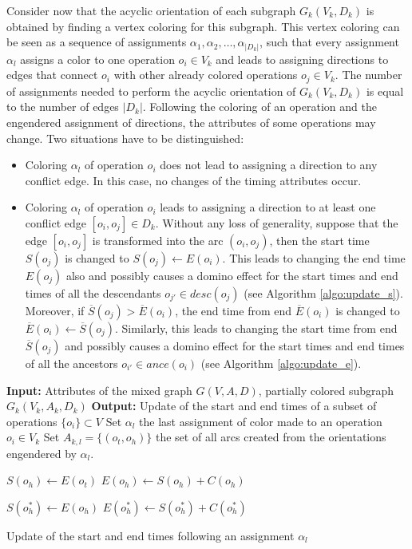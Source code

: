 Consider now that the acyclic orientation of each subgraph $G_k(V_k,D_k)$ is obtained by finding a vertex coloring for this subgraph. This vertex coloring can be seen as a sequence of assignments $\alpha_1, \alpha_2, \ldots, \alpha_{|D_k|}$, such that every assignment $\alpha_l$ assigns a color to one operation $o_i \in V_k$ and leads to assigning directions to edges that connect $o_i$ with other already colored operations $o_j \in V_k$. The number of assignments needed to perform the acyclic orientation of $G_k(V_k,D_k)$ is equal to the number of edges $|D_k|$. Following the coloring of an operation and the engendered assignment of directions, the attributes of some operations may change. Two situations have to be distinguished:

\begin{itemize}
\item Coloring $\alpha_l$ of operation $o_i$ does not lead to assigning a direction to any conflict edge. In this case, no changes of the timing attributes occur.
\item Coloring $\alpha_l$ of operation $o_i$ leads to assigning a direction to at least one conflict edge $[o_i,o_j] \in D_k$. Without any loss of generality, suppose that the edge $[o_i,o_j]$ is transformed into the arc $(o_i,o_j)$, then the start time $S(o_j)$ is changed to $S(o_j) \leftarrow E(o_i)$. This leads to changing the end time $E(o_j)$ also and possibly causes a domino effect for the start times and end times of all the descendants $o_{j'} \in desc(o_j)$ (see Algorithm \ref{algo:update_s}). Moreover, if $\overline{S}(o_j) > \overline{E}(o_i)$, the end time from end $\overline{E}(o_i)$ is changed to $\overline{E}(o_i) \leftarrow \overline{S}(o_j)$. Similarly, this leads to changing the start time from end $\overline{S}(o_j)$ and possibly causes a domino effect for the start times and end times of all the ancestors $o_{i'} \in ance(o_i)$ (see Algorithm \ref{algo:update_e}).
\end{itemize}

\begin{algorithm}[htb]
	\textbf{Input:} Attributes of the mixed graph $G(V,A,D)$, partially colored subgraph $G_k(V_k,A_k,D_k)$\;
	\textbf{Output:} Update of the start and end times of a subset of operations $\{o_i\} \subset V$\;
	Set $\alpha_l$ the last assignment of color made to an operation $o_i \in V_k$\;
	Set $A_{k,l} = \{(o_t,o_h)\}$ the set of all arcs created from the orientations engendered by $\alpha_l$.
		{
				{
					$S(o_h) \leftarrow E(o_t)$\;
					$E(o_h) \leftarrow S(o_h) + C(o_h)$\;
					
				}
		}
		{
			{
						{
							{
								$S(o_h^*) \leftarrow E(o_h)$\;
								$E(o_h^*) \leftarrow S(o_h^*) + C(o_h^*)$\;
								\;
							}
						}
			}
			 \KwRet\;
		}
	\caption{Update of the start and end times following an assignment $\alpha_l$}
	\label{algo:update_s}
\end{algorithm}


